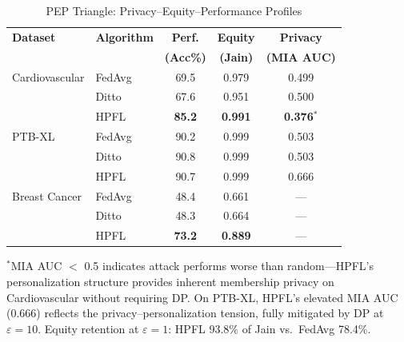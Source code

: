 \documentclass[conference]{IEEEtran}
\begin{document}
\begin{table}[htbp]
\centering
\caption{PEP Triangle: Privacy--Equity--Performance Profiles}
\label{tab:pep_triangle}
\small
\begin{tabular}{llccc}
\toprule
\textbf{Dataset} & \textbf{Algorithm} & \textbf{Perf.} & \textbf{Equity} & \textbf{Privacy} \\
 & & \textbf{(Acc\%)} & \textbf{(Jain)} & \textbf{(MIA AUC)} \\
\midrule
Cardiovascular & FedAvg & 69.5 & 0.979 & 0.499 \\
 & Ditto & 67.6 & 0.951 & 0.500 \\
 & HPFL & \textbf{85.2} & \textbf{0.991} & \textbf{0.376}$^*$ \\
\midrule
PTB-XL & FedAvg & 90.2 & 0.999 & 0.503 \\
 & Ditto & 90.8 & 0.999 & 0.503 \\
 & HPFL & 90.7 & 0.999 & 0.666 \\
\midrule
Breast Cancer & FedAvg & 48.4 & 0.661 & --- \\
 & Ditto & 48.3 & 0.664 & --- \\
 & HPFL & \textbf{73.2} & \textbf{0.889} & --- \\
\bottomrule
\end{tabular}

\vspace{1mm}
\footnotesize{$^*$MIA AUC $<$ 0.5 indicates attack performs worse than random---HPFL's personalization structure provides inherent membership privacy on Cardiovascular without requiring DP. On PTB-XL, HPFL's elevated MIA AUC (0.666) reflects the privacy--personalization tension, fully mitigated by DP at $\varepsilon{=}10$. Equity retention at $\varepsilon{=}1$: HPFL 93.8\% of Jain vs.\ FedAvg 78.4\%.}
\end{table}
\end{document}
